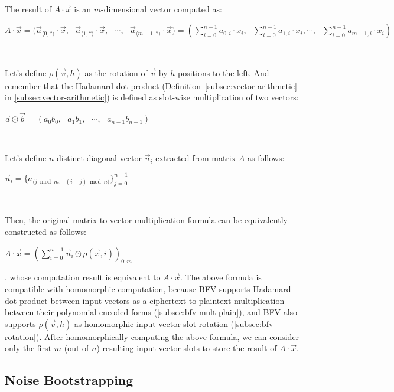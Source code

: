 $ $

The result of $A \cdot \vec{x}$ is an $m$-dimensional vector computed as:

$A \cdot \vec{x} = \Big(\vec{a}_{\langle 0, * \rangle} \cdot \vec{x}, \text{ } \vec{a}_{\langle 1, * \rangle} \cdot \vec{x}, \text{ }\cdots,\text{ } \vec{a}_{\langle m-1, * \rangle} \cdot \vec{x} \Big) = \left(\sum\limits_{i=0}^{n-1} a_{0, i} \cdot  x_i, \text{ } \sum\limits_{i=0}^{n-1}  a_{1, i} \cdot x_i, \cdots, \text{ } \sum\limits_{i=0}^{n-1} a_{m-1, i} \cdot x_i \right)$

$ $

Let's define $\rho(\vec{v}, h)$ as the rotation of $\vec{v}$ by $h$ positions to the left. And remember that the Hadamard dot product (Definition~\ref*{subsec:vector-arithmetic} in \autoref{subsec:vector-arithmetic}) is defined as slot-wise multiplication of two vectors: 

$\vec{a} \odot \vec{b} = (a_0 b_0, \text{ } a_1 b_1, \text{ } \cdots, \text{ } a_{n-1} b_{n-1})$

$ $

Let's define $n$ distinct diagonal vector $\vec{u}_i$ extracted from matrix $A$ as follows: 

$\vec{u}_i = \{a_{\langle j \bmod m, \text{ } (i + j)\bmod n \rangle}\}_{j = 0}^{n-1}$

$ $

Then, the original matrix-to-vector multiplication formula can be equivalently constructed as follows:

$A\cdot\vec x=\left(\sum_{i=0}^{n-1}\vec u_i\odot\rho(\vec x,i)\right)_{0:m}$

, whose computation result is equivalent to $A \cdot \vec{x}$. 
The above formula is compatible with homomorphic computation, because BFV supports Hadamard dot product between input vectors as a ciphertext-to-plaintext multiplication between their polynomial-encoded forms (\autoref{subsec:bfv-mult-plain}), and BFV also supports $\rho(\vec{v}, h)$ as homomorphic input vector slot rotation (\autoref{subsec:bfv-rotation}). After homomorphically computing the above formula, we can consider only the first $m$ (out of $n$) resulting input vector slots to store the result of $A \cdot \vec{x}$. 



\subsection{Noise Bootstrapping}
\label{subsec:bfv-bootstrapping}

